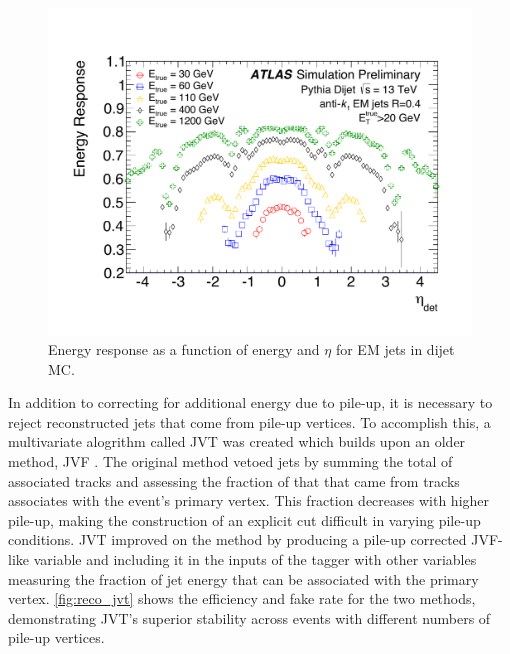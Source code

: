 \begin{centering}
\begin{figure}[!hbt]
\myfloatalign
\includegraphics[width=.9\linewidth]{figures/reco/fig_04a.pdf}
\caption{ Energy response as a function of energy and $\eta$ for \ac{EM} jets in dijet \ac{MC}. \cite{ATL-PHYS-PUB-2015-015} }
\label{fig:reco_JES}
\end{figure}
\end{centering}

In addition to correcting for additional energy due to pile-up, it is necessary to reject reconstructed jets that come from pile-up vertices. To accomplish this, a multivariate alogrithm called \ac{JVT} was created which builds upon an older method, \ac{JVF} \cite{ATLAS-CONF-2014-018}. The original method vetoed jets by summing the total \pt of associated tracks and assessing the fraction of that \pt that came from tracks associates with the event's primary vertex. This fraction decreases with higher pile-up, making the construction of an explicit cut difficult in varying pile-up conditions. \ac{JVT} improved on the method by producing a pile-up corrected \ac{JVF}-like variable and including it in the inputs of the tagger with other variables measuring the fraction of jet energy that can be associated with the primary vertex. \autoref{fig:reco_jvt} shows the efficiency and fake rate for the two methods, demonstrating \ac{JVT}'s superior stability across events with different numbers of pile-up vertices. 


